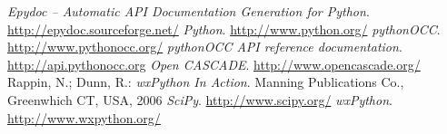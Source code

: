 \begin{thebibliography}{99}
%
%
%
			{\sl Epydoc -- Automatic API Documentation Generation for Python}.
			\href{http://epydoc.sourceforge.net/} 
			{http://epydoc.sourceforge.net/}
%
			{\sl Python}.
			\href{http://www.python.org/} 
			{http://www.python.org/}
%
			{\sl pythonOCC}.
			\href{http://www.pythonocc.org/} 
			{http://www.pythonocc.org/}
%
			{\sl pythonOCC API reference documentation}.
			\href{http://api.pythonocc.org} 
			{http://api.pythonocc.org}
%
			{\sl Open CASCADE}.
			\href{http://www.opencascade.org/} 
			{http://www.opencascade.org/}
%
			{\sc Rappin, N.; Dunn, R.}:
			{\sl wxPython In Action}. 
			Manning Publications Co., Greenwhich CT, USA, 2006
%
			{\sl SciPy}.
			\href{http://www.scipy.org/} 
			{http://www.scipy.org/}
%
%
%
			{\sl wxPython}.
			\href{http://www.wxpython.org/} 
			{http://www.wxpython.org/}
%
%
\end{thebibliography}
